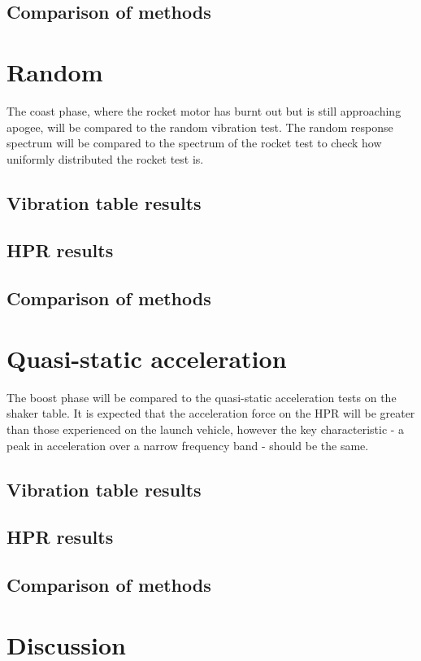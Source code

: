 \documentclass[]{report}
\begin{document}
\subsection{Comparison of methods}

\section{Random}
The coast phase, where the rocket motor has burnt out but is still approaching apogee, will be compared to the random vibration test. The random response spectrum will be compared to the spectrum of the rocket test to check how uniformly distributed the rocket test is.
\subsection{Vibration table results}
\subsection{HPR results}
\subsection{Comparison of methods}

\section{Quasi-static acceleration}
The boost phase will be compared to the quasi-static acceleration tests on the shaker table. It is expected that the acceleration force on the HPR will be greater than those experienced on the launch vehicle, however the key characteristic - a peak in acceleration over a narrow frequency band - should be the same.
\subsection{Vibration table results}
\subsection{HPR results}
\subsection{Comparison of methods}

\section{Discussion}
\end{document}
